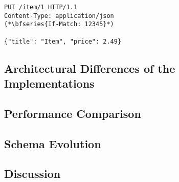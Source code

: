 \begin{lstlisting}[caption={Request to update resources}, showlines=true, label=lst:locking-request]
PUT /item/1 HTTP/1.1
Content-Type: application/json
(*\bfseries{If-Match: 12345}*)

{"title": "Item", "price": 2.49}
\end{lstlisting}

\subsection{Architectural Differences of the Implementations}

\subsection{Performance Comparison}

\subsection{Schema Evolution}

\subsection{Discussion}